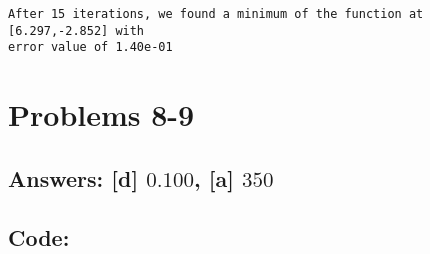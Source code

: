\documentclass[11pt]{article}
\begin{document}
    \begin{Verbatim}[commandchars=\\\{\}]
After 15 iterations, we found a minimum of the function at [6.297,-2.852] with
error value of 1.40e-01
    \end{Verbatim}

    \hypertarget{problems-8-9}{%
\section{Problems 8-9}\label{problems-8-9}}

\hypertarget{answers-d-0.100-a-350}{%
\subsection{\texorpdfstring{Answers: {[}d{]} \(0.100\), {[}a{]}
\(350\)}{Answers: {[}d{]} 0.100, {[}a{]} 350}}\label{answers-d-0.100-a-350}}

\hypertarget{code}{%
\subsection{Code:}\label{code}}
\end{document}
